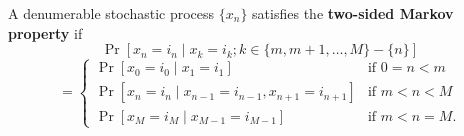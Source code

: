 A denumerable stochastic process $\{x_n\}$ satisfies the \textbf{two-sided Markov property} if
$$\Pr[x_n = i_n \mid x_k = i_k; k \in \{m, m+1, \ldots, M\} - \{n\}]$$
$$= \begin{cases} \Pr[x_0 = i_0 \mid x_1 = i_1] & \text{if } 0 = n < m \\ \Pr[x_n = i_n \mid x_{n-1} = i_{n-1}, x_{n+1} = i_{n+1}] & \text{if } m < n < M \\ \Pr[x_M = i_M \mid x_{M-1} = i_{M-1}] & \text{if } m < n = M. \end{cases}$$
